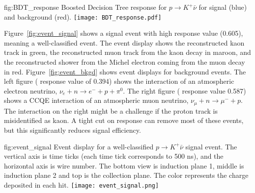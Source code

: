 \begin{dunefigure}
{fig:BDT_response}
{Boosted Decision Tree response for $p\rightarrow K^{+} \bar{\nu}$ for signal (blue) and background (red).}
\texttt{[image: BDT\_response.pdf]}
\end{dunefigure} 



Figure~\ref{fig:event_signal} shows a signal event with high  response value (0.605), meaning a well-classified event. The event display shows the reconstructed kaon track in green, the reconstructed muon track from the kaon decay in maroon, and the reconstructed shower from the Michel electron coming from the muon decay in red. Figure~\ref{fig:event_bkgd} shows event displays for background events.  The left figure ( response value of 0.394) shows the interaction of an atmospheric electron neutrino, $\nu_{e}+n\rightarrow e^{-}+p+\pi^{0}$. The right figure ( response value 0.587) shows a CCQE interaction of an atmospheric muon neutrino, $\nu_{\mu}+n \rightarrow \mu^{-}+p$. The interaction on the right might be a challenge if the proton track is misidentified as kaon. A tight cut on  response can remove most of these events, but this significantly reduces signal efficiency.


\begin{dunefigure}
{fig:event_signal}
{Event display for a well-classified $p\rightarrow K^{+} \bar{\nu}$ signal event.  The vertical axis is time ticks (each time tick corresponds to 500 ns), and the horizontal axis is wire number. The bottom view is induction plane 1, middle is induction plane 2 and top is the collection plane. The color represents the charge deposited in each hit.}
\texttt{[image: event\_signal.png]}
\end{dunefigure} 

